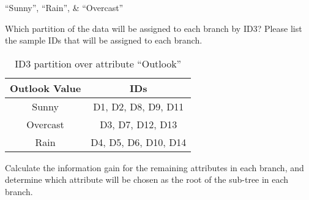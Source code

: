 ``Sunny'', ``Rain'', \& ``Overcast''

\begin{subproblem}
  Which partition of the data will be assigned to each branch by ID3? Please list the sample IDs that will be assigned to each branch.
\end{subproblem}

\begin{table}[h]
  \centering
  \caption{ID3 partition over attribute ``Outlook''}\label{tab:P02:Partition}
  \begin{tabular}{|c|c|}
    \hline
    \textbf{Outlook Value} & \textbf{IDs} \\\hline
    Sunny    & D1, D2, D8, D9, D11 \\\hline
    Overcast & D3, D7, D12, D13 \\\hline
    Rain     & D4, D5, D6, D10, D14 \\\hline
  \end{tabular}
\end{table}

\begin{subproblem}
  Calculate the information gain for the remaining attributes in each branch, and determine which attribute will be chosen as the root of the sub-tree in each branch.
\end{subproblem}

